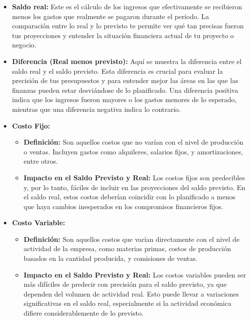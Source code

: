 \documentclass[letter,12pt]{article}
\begin{document}
\begin{itemize}
			\item \textbf{Saldo real: } Este es el cálculo de los ingresos que efectivamente se recibieron menos los gastos que realmente se pagaron durante el período. La comparación entre lo real y lo previsto te permite ver qué tan precisas fueron tus proyecciones y entender la situación financiera actual de tu proyecto o negocio.
			\item \textbf{Diferencia (Real menos previsto): } Aquí se muestra la diferencia entre el saldo real y el saldo previsto. Esta diferencia es crucial para evaluar la precisión de tus presupuestos y para entender mejor las áreas en las que las finanzas pueden estar desviándose de lo planificado. Una diferencia positiva indica que los ingresos fueron mayores o los gastos menores de lo esperado, mientras que una diferencia negativa indica lo contrario.
			\item \textbf{Costo Fijo:}
			\begin{itemize}
				\item \textbf{Definición:} Son aquellos costos que no varían con el nivel de producción o ventas. Incluyen gastos como alquileres, salarios fijos, y amortizaciones, entre otros.
				\item \textbf{Impacto en el Saldo Previsto y Real:} Los costos fijos son predecibles y, por lo tanto, fáciles de incluir en las proyecciones del saldo previsto. En el saldo real, estos costos deberían coincidir con lo planificado a menos que haya cambios inesperados en los compromisos financieros fijos.
			\end{itemize}	
			\item \textbf{Costo Variable:}
			\begin{itemize}
				\item \textbf{Definición:} Son aquellos costos que varían directamente con el nivel de actividad de la empresa, como materias primas, costos de producción basados en la cantidad producida, y comisiones de ventas.
				\item \textbf{Impacto en el Saldo Previsto y Real: } Los costos variables pueden ser más difíciles de predecir con precisión para el saldo previsto, ya que dependen del volumen de actividad real. Esto puede llevar a variaciones significativas en el saldo real, especialmente si la actividad económica difiere considerablemente de lo previsto.
			\end{itemize}
		\end{itemize}
\end{document}
